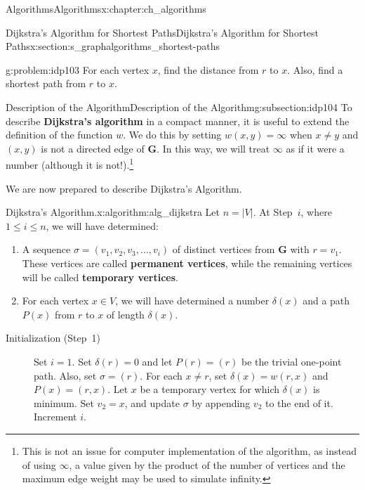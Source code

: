 \documentclass[oneside,10pt,]{book}
\newcommand{\terminology}[1]{\textbf{#1}}
\numberwithin{equation}{section}
\newcommand{\bfG}{\mathbf{G}}
\begin{document}
\begin{chapterptx}{Algorithms}{}{Algorithms}{}{}{x:chapter:ch_algorithms}
\begin{sectionptx}{Dijkstra's Algorithm for Shortest Paths}{}{Dijkstra's Algorithm for Shortest Paths}{}{}{x:section:s_graphalgorithms_shortest-paths}
\begin{introduction}{}
\begin{problem}{}{g:problem:idp103}%
For each vertex \(x\), find the distance from \(r\) to \(x\). Also, find a shortest path from \(r\) to \(x\).%
\end{problem}
\end{introduction}%
%
%
\typeout{************************************************}
\typeout{************************************************}
%
\begin{subsectionptx}{Description of the Algorithm}{}{Description of the Algorithm}{}{}{g:subsection:idp104}
To describe \terminology{Dijkstra's algorithm} in a compact manner, it is useful to extend the definition of the function \(w\). We do this by setting \(w(x,y)=\infty\) when \(x\neq y\) and \((x,y)\) is not a directed edge of \(\bfG\). In this way, we will treat \(\infty\) as if it were a number (although it is not!).\footnote{This is not an issue for computer implementation of the algorithm, as instead of using \(\infty\), a value given by the product of the number of vertices and the maximum edge weight may be used to simulate infinity.\label{g:fn:idp105}}%
\par
We are now prepared to describe Dijkstra's Algorithm.%
\begin{algorithm}{Dijkstra's Algorithm.}{}{x:algorithm:alg_dijkstra}%
%
%
Let \(n=|V|\). At Step~\(i\), where \(1\le i\le n\), we will have determined:%
\begin{enumerate}
\item{}A sequence \(\sigma=(v_1,v_2,v_3,\dots,v_i)\) of distinct vertices from \(\bfG\) with \(r=v_1\).  These vertices are called \terminology{permanent vertices}, while the remaining vertices will be called \terminology{temporary vertices}.%
\item{}For each vertex \(x\in V\), we will have determined a number \(\delta(x)\) and a path \(P(x)\) from \(r\) to \(x\) of length \(\delta(x)\).%
\end{enumerate}
%
\begin{description}
\item[{Initialization (Step~1)}]Set \(i=1\). Set \(\delta(r)=0\) and let \(P(r)=(r)\) be the trivial one-point path. Also, set \(\sigma= (r)\). For each \(x\neq r\), set \(\delta(x)= w(r,x)\) and \(P(x)=(r,x)\). Let \(x\) be a temporary vertex for which \(\delta(x)\) is minimum. Set \(v_2 = x\), and update \(\sigma\) by appending \(v_2\) to the end of it. Increment \(i\).%

\end{description}
\end{algorithm}
\end{subsectionptx}
\end{sectionptx}
\end{chapterptx}
\end{document}
